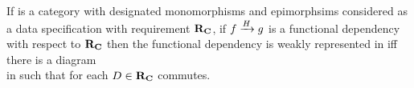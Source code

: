 \documentclass[12pt,a4paper]{article}
\theoremstyle{remark}
\begin{document}
\begin{definition}
If \catcw is a category with designated monomorphisms and epimorphsims 
considered as a data specification with requirement $\reqtc$, 
if $\fundep{H}{f}{g}$  is a functional dependency with respect to $\reqtc$
then the functional dependency is weakly represented in \catcw iff
there  is a diagram\\
\medskip
\scalebox{0.9}{\representationdiagram} 
in \catcw such that for each $D \in \reqtc$
\scalebox{0.85}{\mappedrepresentationdiagram}
commutes.
\end{definition}
\end{document}

